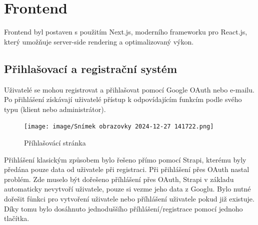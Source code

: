\documentclass[12pt, a4paper,
openright
]{report}
\begin{document}
\clearpage
    \section{Frontend} 
    Frontend byl postaven s použitím Next.js, moderního frameworku pro React.js, který umožňuje server-side rendering a optimalizovaný výkon.
    
\subsection{Přihlašovací a registrační systém}
Uživatelé se mohou registrovat a přihlašovat pomocí Google OAuth nebo e-mailu.
Po přihlášení získávají uživatelé přístup k odpovídajícím funkcím podle svého typu (klient nebo administrátor).
\begin{figure}[h]
    \centering
    \texttt{[image: image/Snímek obrazovky 2024-12-27 141722.png]}
    \caption{Příhlašovácí stránka}
    \label{fig:enter-label}
\end{figure}

Přihlášení klasickým způsobem bylo řešeno přímo pomocí Strapi, kterému byly předána pouze data od uživatele při registraci. Při přihlášení přes OAuth nastal problém.
Zde muselo být dořešeno příhlášení přes OAuth, Strapi v základu automaticky nevytvoří uživatele, pouze si vezme jeho data z Googlu. Bylo nutné dořešit fůnkci pro vytvoření uživatele nebo příhlášení uživatele pokud již existuje. Díky tomu bylo dosáhnuto jednoduššího příhlášení/registrace pomocí jednoho tlačítka.
\end{document}
